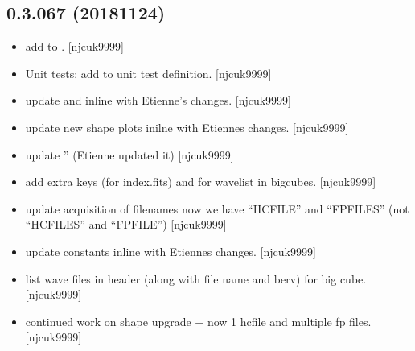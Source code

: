 \documentclass[a4paper,10pt,english]{report}
\begin{document}
\subsection{0.3.067 (2018\sphinxhyphen{}11\sphinxhyphen{}24)}
\label{\detokenize{misc/changelog:id275}}\begin{itemize}
\item {} 
 \sphinxhyphen{} add  to . {[}njcuk9999{]}

\item {} 
Unit tests: add  to unit test definition. {[}njcuk9999{]}

\item {} 
 \sphinxhyphen{} update  and  in\sphinxhyphen{}line with
Etienne’s changes. {[}njcuk9999{]}

\item {} 
 \sphinxhyphen{} update new shape plots in\sphinxhyphen{}ilne with Etiennes changes.
{[}njcuk9999{]}

\item {} 
 \sphinxhyphen{} update ” (Etienne updated it) {[}njcuk9999{]}

\item {} 
 \sphinxhyphen{} add extra keys (for index.fits) and for wave\sphinxhyphen{}list
in bigcubes. {[}njcuk9999{]}

\item {} 
 \sphinxhyphen{} update acquisition of filenames now we have “HCFILE”
and “FPFILES” (not “HCFILES” and “FPFILE”) {[}njcuk9999{]}

\item {} 
 \sphinxhyphen{} update constants inline with Etiennes
changes. {[}njcuk9999{]}

\item {} 
 \sphinxhyphen{} list wave files in header (along with file
name and berv) for big cube. {[}njcuk9999{]}

\item {} 
 \sphinxhyphen{} continued work on shape upgrade + now 1 hcfile
and multiple fp files. {[}njcuk9999{]}

\end{itemize}
\end{document}

